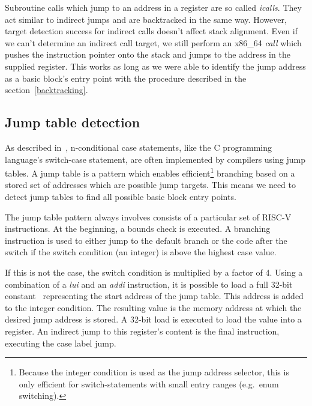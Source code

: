 \documentclass[course=eragp]{aspdoc}
\begin{document}
\par

Subroutine calls which jump to an address in a register are so called \emph{icalls}. They act
similar to indirect jumps and are backtracked in the same way. However, target detection success for indirect calls
doesn't affect stack alignment. Even if we can't determine an indirect call target, we still perform
an x86\_64 \emph{call} which pushes the instruction pointer onto the stack and jumps to the address
in the supplied register. This works as long as we were able to identify the jump address as a basic
block's entry point with the procedure described in the section\ \ref{backtracking}.

\subsection{Jump table detection}

As described in\ \cite{jump_table_paper}, n-conditional case statements, like the C programming
language's switch-case statement, are often implemented by compilers using jump
tables. A jump table is a pattern which enables efficient\footnote{Because the integer condition is
    used as the jump address selector, this is only efficient for switch-statements with small entry
    ranges (e.g.\ enum switching).} branching based
on a stored set of addresses which are possible jump targets. This means we need to detect jump tables to find
all possible basic block entry points.

\par

The jump table pattern always involves consists of a particular set of RISC-V instructions.
At the beginning, a bounds check is executed. A branching instruction is used to either jump to the
default branch or the code after the switch if the switch condition (an integer) is above the
highest case value.

\par

If this is not the case, the switch condition is multiplied by a factor of 4.
Using a combination of a \emph{lui} and an \emph{addi} instruction, it is possible to load a full
32-bit constant\ \cite[p.~19]{rvspec} representing the start address of the jump table.
This address is added to the integer condition. The resulting value is the memory address
at which the desired jump address is stored. A 32-bit load is executed to load the value into a
register. An indirect jump to this register's content is the final instruction, executing the case
label jump.
\end{document}
